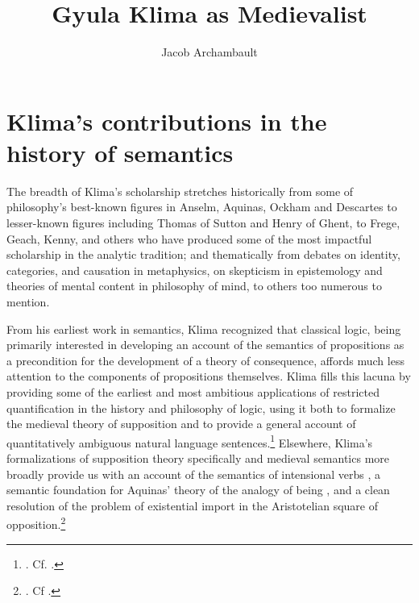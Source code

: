 \documentclass[]{article}
\title{Gyula Klima as Medievalist}
\author{Jacob Archambault}
\begin{document}
\maketitle

\section{Klima's contributions in the history of semantics}
The breadth of Klima's scholarship stretches 
historically from some of philosophy's best-known figures in Anselm, Aquinas, Ockham and Descartes 
to lesser-known figures including Thomas of Sutton and Henry of Ghent, 
to Frege, Geach, Kenny, and others who have produced some of the most impactful scholarship in the analytic tradition; 
and 
thematically from debates 
on identity, categories, and causation in metaphysics, 
on skepticism in epistemology and theories of mental content in philosophy of mind, 
to others too numerous to mention. 

From his earliest work in semantics, 
Klima recognized that classical logic, 
being primarily interested in developing an account of the semantics of propositions as a precondition for the development of a theory of consequence, 
affords much less attention to the components of propositions themselves. 
Klima fills this lacuna by providing some of the earliest and most ambitious applications of restricted quantification in the history and philosophy of logic, 
using it both to formalize the medieval theory of supposition 
and to provide a general account of quantitatively ambiguous natural language sentences.\footnote{\autocite{Klima1988,Klima1990,KlimaSandu1990,Klima1991b}. Cf. \autocite{Parsons2014}.} 
Elsewhere, 
Klima's formalizations of supposition theory specifically 
and medieval semantics more broadly 
provide us with an account of the semantics of intensional verbs \autocite{Klima1991}, 
a semantic foundation for Aquinas' theory of the analogy of being \autocite{Klima1996,Klima2002}, 
and a clean resolution of the problem of existential import in the Aristotelian square of opposition.\footnote{\autocite{Klima2001}. Cf \autocite{Read2015b}.} 
\end{document}
